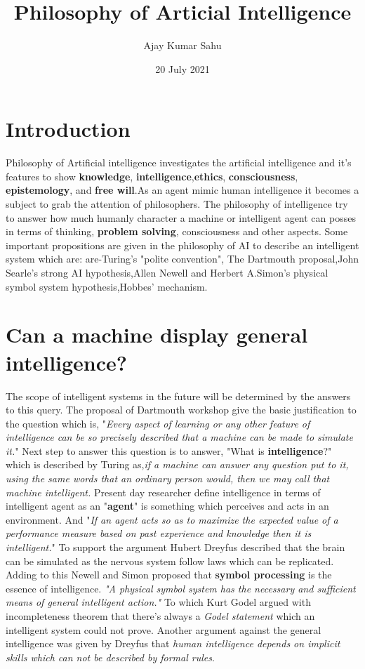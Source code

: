 \documentclass{article}
\title{\textbf{Philosophy of Articial Intelligence}}
\author{Ajay Kumar Sahu }
\date{20 July 2021}
\begin{document}
\maketitle

\section{Introduction}

Philosophy of Artificial intelligence investigates the artificial intelligence and it's features to show \textbf{knowledge}, \textbf{intelligence},\textbf{ethics}, \textbf{consciousness}, \textbf{epistemology}, and \textbf{free will}.As an agent mimic human intelligence it becomes a subject to grab the attention of philosophers. The philosophy of intelligence try to answer how much humanly character a machine or intelligent agent can posses in terms of thinking, \textbf{problem solving}, consciousness and other aspects. Some important propositions are given in the philosophy of AI to describe an intelligent system which are: are-Turing's "polite convention", The Dartmouth proposal,John Searle's strong AI hypothesis,Allen Newell and Herbert A.Simon's physical symbol system hypothesis,Hobbes' mechanism.

\section{Can a machine display general intelligence?}
The scope of intelligent systems in the future will be determined by the answers to this query. The proposal of Dartmouth workshop give the basic justification to the question which is, "\textit{Every aspect of learning or any other feature of intelligence can be so precisely described that a machine can be made to simulate it.}" Next step to answer this question is to answer, "What is \textbf{intelligence}?" which is described by Turing as,\textit{if a machine can answer any question put to it, using the same words that an ordinary person would, then we may call that machine intelligent. }Present day researcher define intelligence in terms of intelligent agent as an "\textbf{agent}" is something which perceives and acts in an environment. And "\textit{If an agent acts so as to maximize the expected value of a performance measure based on past experience and knowledge then it is intelligent.}" To support the argument Hubert Dreyfus described that the brain can be simulated as the nervous system follow laws which can be replicated. Adding to this Newell and Simon proposed that \textbf{symbol processing} is the essence of intelligence. \textit{"A physical symbol system has the necessary and sufficient means of general intelligent action."} To which Kurt Godel argued with incompleteness theorem that there's always a \textit{Godel statement} which an intelligent system could not prove. Another argument against the general intelligence was given by Dreyfus that \textit{human intelligence depends on implicit skills which can not be described by formal rules}.
\end{document}
